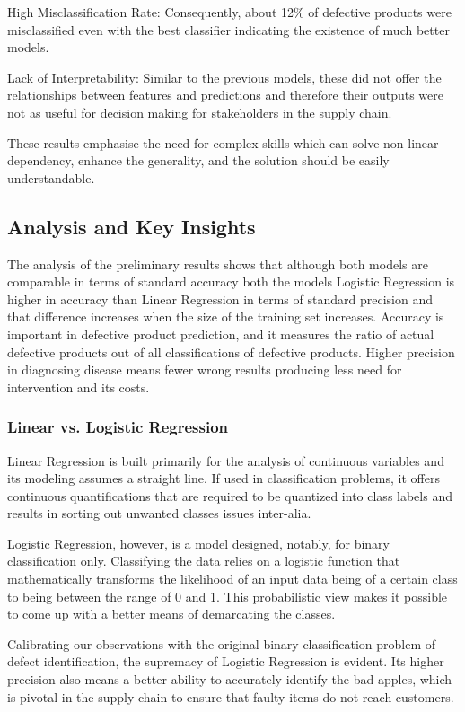 \documentclass[conference]{IEEEtran}
\begin{document}
High Misclassification Rate: Consequently, about 12\% of defective products were misclassified even with the best classifier indicating the existence of much better models.

Lack of Interpretability: Similar to the previous models, these did not offer the relationships between features and predictions and therefore their outputs were not as useful for decision making for stakeholders in the supply chain.

These results emphasise the need for complex skills which can solve non-linear dependency, enhance the generality, and the solution should be easily understandable.

\subsection{Analysis and Key Insights}
The analysis of the preliminary results shows that although both models are comparable in terms of standard accuracy both the models Logistic Regression is higher in accuracy than Linear Regression in terms of standard precision and that difference increases when the size of the training set increases. Accuracy is important in defective product prediction, and it measures the ratio of actual defective products out of all classifications of defective products. Higher precision in diagnosing disease means fewer wrong results producing less need for intervention and its costs.

\subsubsection{Linear vs. Logistic Regression}

Linear Regression is built primarily for the analysis of continuous variables and its modeling assumes a straight line. If used in classification problems, it offers continuous quantifications that are required to be quantized into class labels and results in sorting out unwanted classes issues inter-alia.

Logistic Regression, however, is a model designed, notably, for binary classification only. Classifying the data relies on a logistic function that mathematically transforms the likelihood of an input data being of a certain class to being between the range of 0 and 1. This probabilistic view makes it possible to come up with a better means of demarcating the classes.

Calibrating our observations with the original binary classification problem of defect identification, the supremacy of Logistic Regression is evident. Its higher precision also means a better ability to accurately identify the bad apples, which is pivotal in the supply chain to ensure that faulty items do not reach customers.
\end{document}
